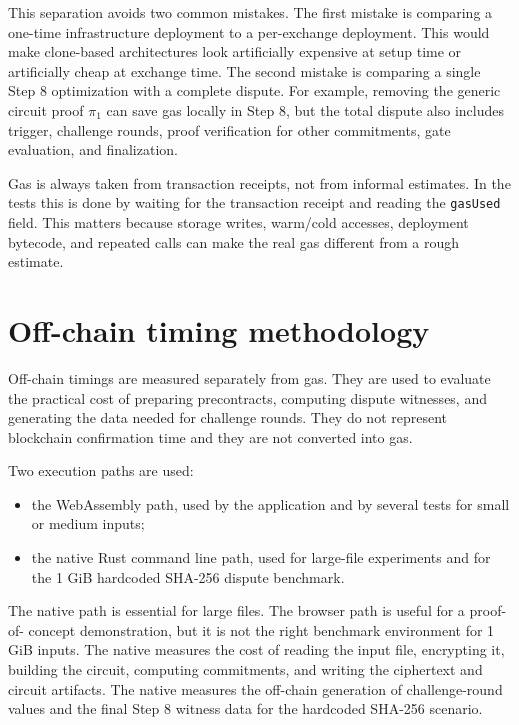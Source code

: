This separation avoids two common mistakes. The first mistake is comparing a one-time
infrastructure deployment to a per-exchange deployment. This would make clone-based
architectures look artificially expensive at setup time or artificially cheap at exchange
time. The second mistake is comparing a single Step 8 optimization with a complete dispute.
For example, removing the generic circuit proof \(\pi_1\) can save gas locally in Step 8,
but the total dispute also includes trigger, challenge rounds, proof verification for other
commitments, gate evaluation, and finalization.

Gas is always taken from transaction receipts, not from informal estimates. In the tests this
is done by waiting for the transaction receipt and reading the \texttt{gasUsed} field. This
matters because storage writes, warm/cold accesses, deployment bytecode, and repeated calls
can make the real gas different from a rough estimate.

\section{Off-chain timing methodology}

Off-chain timings are measured separately from gas. They are used to evaluate the practical
cost of preparing precontracts, computing dispute witnesses, and generating the data needed
for challenge rounds. They do not represent blockchain confirmation time and they are not
converted into gas.

Two execution paths are used:

\begin{itemize}
  \item the WebAssembly path, used by the application and by several tests for small or
  medium inputs;
  \item the native Rust command line path, used for large-file experiments and for the 1 GiB
  hardcoded SHA-256 dispute benchmark.
\end{itemize}

The native path is essential for large files. The browser path is useful for a proof-of-
concept demonstration, but it is not the right benchmark environment for 1 GiB inputs. The
native  measures the cost of reading the input file, encrypting it,
building the circuit, computing commitments, and writing the ciphertext and circuit
artifacts. The native  measures the off-chain generation
of challenge-round values and the final Step 8 witness data for the hardcoded SHA-256
scenario.

